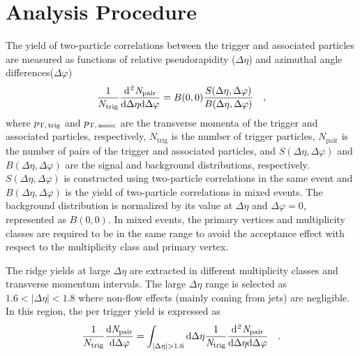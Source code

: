 \section{Analysis Procedure}
\label{sec:ana}

The yield of two-particle correlations between the trigger and associated particles are measured as functions of relative pseudorapidity ($\Delta\eta$) and azimuthal angle differences($\Delta\varphi$)
\begin{eqnarray}
\frac{1}{N_{\rm{trig}}} \frac{ \rm{d}\it{}^{2} N_{\rm{pair}} }{ \rm{d} \Delta\eta \rm{d}\Delta\varphi} = B(0, 0)\frac{S(\Delta\eta, \Delta\varphi)}{B(\Delta\eta, \Delta\varphi)}\quad,
\label{eq:corrfunction}
\end{eqnarray}
where  $p_\mathrm{T,\,trig}$ and $p_\mathrm{T,\,assoc}$ are the transverse momenta of  the trigger and associated particles, respectively, $N_\mathrm{trig}$ is the number of trigger particles, $N_\mathrm{pair}$ is the number of pairs of the trigger and associated particles, and $S (\Delta\eta, \Delta\varphi)$ and $B (\Delta\eta, \Delta\varphi)$ are the signal and background distributions, respectively. $S (\Delta\eta, \Delta\varphi)$ is constructed using two-particle correlations in the same event and $B(\Delta\eta, \Delta\varphi)$ is the yield of two-particle correlations in mixed events. The background distribution is normalized by its value at $\Delta\eta$ and $\Delta\varphi = 0$, represented as $B (0,0)$. In mixed events, the primary vertices and multiplicity classes are required to be in the same range to avoid the acceptance effect with respect to the multiplicity class and primary vertex.

The ridge yields at large $\Delta\eta$ are extracted in different multiplicity classes and transverse momentum intervals. The large $\Delta\eta$ range is selected as $1.6<|\Delta\eta|<1.8$ where non-flow effects (mainly coming from jets) are negligible. In this region, the per trigger yield is expressed as
\begin{eqnarray}
\frac{1}{N_{\rm{trig}}} \frac{ \rm{d}\it{}N_{\rm{pair}} }{ \rm{d}\Delta\varphi } = \int_{|\Delta \eta|>1.6} \rm{d} \Delta \eta \frac{1}{\it{N}_{\rm{trig}}} \frac{ \rm{d}\it{}^{2} N_{\rm{pair}} }{ \rm{d}\Delta\eta d\Delta\varphi} \quad.
\end{eqnarray}

